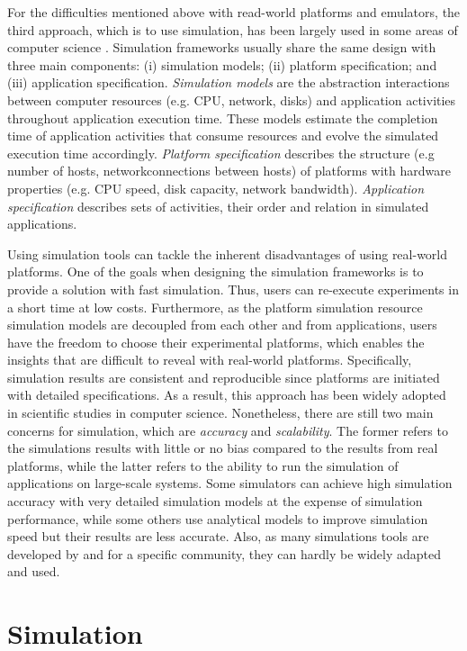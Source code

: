 For the difficulties mentioned above with read-world platforms 
and emulators, the third approach, which is to use simulation, has been  
largely used in some areas of computer science \cite{casanova2008simgrid}.  
Simulation frameworks usually share the same design with three main 
components: (i) simulation models; (ii) platform specification; 
and (iii) application specification.
\textit{Simulation models} are the abstraction interactions between computer 
resources (e.g. CPU, network, disks) and application activities throughout 
application execution time. 
These models estimate the completion time of application activities 
that consume resources and evolve the simulated execution time accordingly.
\textit{Platform specification} describes the structure (e.g number of hosts, 
networkconnections between hosts) of platforms with hardware properties 
(e.g. CPU speed, disk capacity, network bandwidth).
\textit{Application specification} describes sets of activities, their order 
and relation in simulated applications.

Using simulation tools can tackle the inherent disadvantages of using 
real-world platforms. 
One of the goals when designing the simulation frameworks is to provide 
a solution with fast simulation. 
Thus, users can re-execute experiments in a short time at low costs.
Furthermore, as the platform simulation resource simulation models 
are decoupled from each other and from applications, users have 
the freedom to choose their experimental platforms, which enables the 
insights that are difficult to reveal with real-world platforms. 
Specifically, simulation results are consistent and reproducible since 
platforms are initiated with detailed specifications. 
As a result, this approach has been widely adopted in scientific studies
in computer science. 
Nonetheless, there are still two main concerns for simulation, which 
are \textit{accuracy} and \textit{scalability}. The former refers to the 
simulations results with little or no bias compared to the results from 
real platforms, while the latter refers to the ability to run the simulation 
of applications on large-scale systems. 
Some simulators can achieve high simulation accuracy with very detailed 
simulation models at the expense of simulation performance, while 
some others use analytical models to improve simulation speed but 
their results are less accurate.
Also, as many simulations tools are developed by and for a specific community, 
they can hardly be widely adapted and used.

\section{Simulation}

